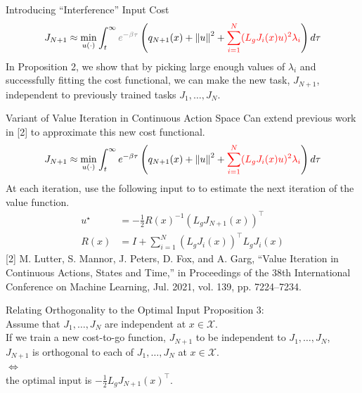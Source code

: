 \begin{frame}{Introducing ``Interference'' Input Cost}
	\begin{align*}
		{J}_{N + 1} \approx \min_{u(\cdot)} \int_t^{\infty} { \color{gray}  e^{- \beta \tau } } \left( q_{N + 1}(x) + { \lVert u \rVert }^2 + { \color{red} \sum_{i = 1}^N ( L_g {J}_i (x) u)^2 \lambda_i } \right) d \tau
        \end{align*}
	\seprule
	In Proposition 2, we show that by picking large enough values of $\lambda_i$ and successfully fitting the cost functional, we can make the new task, $J_{N + 1}$, independent to previously trained tasks $J_1, \ldots, J_N$. 
\end{frame}

\begin{frame}{Variant of Value Iteration in Continuous Action Space}
	Can extend previous work in [2] to approximate this new cost functional.
	\begin{align*}
                {J}_{N + 1} \approx \min_{u(\cdot)} \int_t^{\infty} e^{- \beta \tau } \left( q_{N + 1}(x) + { \lVert u \rVert }^2 + { \color{red} \sum_{i = 1}^N ( L_g {J}_i (x) u)^2 \lambda_i } \right) d \tau
	\end{align*}
	At each iteration, use the following input to to estimate the next iteration of the value function.
	\begin{align*}
                u^{\star} &= - \frac{1}{2} {R(x)}^{-1} ( L_g {J}_{N + 1} (x) )^{\top} \\ 
                R(x) &= I + \sum_{i = 1}^N ( L_g {J}_i (x) )^{\top} L_g {J}_i (x)
	\end{align*}
	\seprule
	\footnotesize{[2] M. Lutter, S. Mannor, J. Peters, D. Fox, and A. Garg, “Value Iteration in Continuous Actions, States and Time,” in Proceedings of the 38th International Conference on Machine Learning, Jul. 2021, vol. 139, pp. 7224–7234.}
\end{frame}

\begin{frame}{Relating Orthogonality to the Optimal Input}
Proposition 3:\\
Assume that ${J}_1, \ldots, {J}_N$ are independent at $x \in \mathcal{X}$.\\
If we train a new cost-to-go function, ${J}_{N + 1}$ to be independent to ${J}_1, \ldots, {J}_N$,\\
${J}_{N + 1}$ is orthogonal to each of ${J}_1, \ldots, {J}_N$ at $x \in \mathcal{X}$.\\ 
$\Leftrightarrow$\\ 
the optimal input is $- \frac{1}{2} L_g {J}_{N + 1} (x)^{\top}$.
\end{frame}

